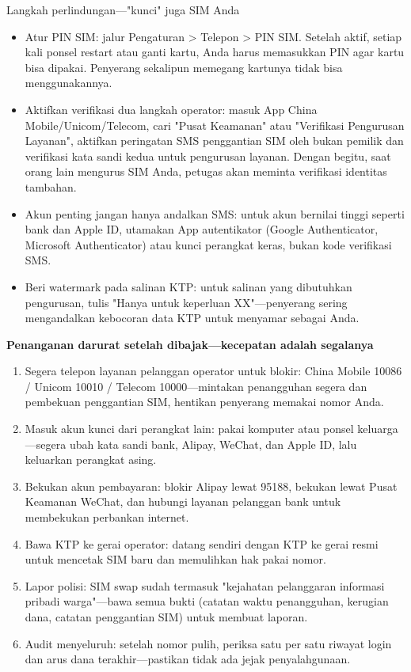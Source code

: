\begin{tcbwarn}{Langkah perlindungan—"kunci" juga SIM Anda}
\begin{itemize}
  \item Atur PIN SIM: jalur Pengaturan > Telepon > PIN SIM. Setelah aktif, setiap kali ponsel restart atau ganti kartu, Anda harus memasukkan PIN agar kartu bisa dipakai. Penyerang sekalipun memegang kartunya tidak bisa menggunakannya.
  \item Aktifkan verifikasi dua langkah operator: masuk App China Mobile/Unicom/Telecom, cari "Pusat Keamanan" atau "Verifikasi Pengurusan Layanan", aktifkan peringatan SMS penggantian SIM oleh bukan pemilik dan verifikasi kata sandi kedua untuk pengurusan layanan. Dengan begitu, saat orang lain mengurus SIM Anda, petugas akan meminta verifikasi identitas tambahan.
  \item Akun penting jangan hanya andalkan SMS: untuk akun bernilai tinggi seperti bank dan Apple ID, utamakan App autentikator (Google Authenticator, Microsoft Authenticator) atau kunci perangkat keras, bukan kode verifikasi SMS.
  \item Beri watermark pada salinan KTP: untuk salinan yang dibutuhkan pengurusan, tulis "Hanya untuk keperluan XX"—penyerang sering mengandalkan kebocoran data KTP untuk menyamar sebagai Anda.
\end{itemize}

\end{tcbwarn}

\textbf{Penanganan darurat setelah dibajak—kecepatan adalah segalanya}\par

\begin{enumerate}
  \item Segera telepon layanan pelanggan operator untuk blokir: China Mobile 10086 / Unicom 10010 / Telecom 10000—mintakan penangguhan segera dan pembekuan penggantian SIM, hentikan penyerang memakai nomor Anda.
  \item Masuk akun kunci dari perangkat lain: pakai komputer atau ponsel keluarga—segera ubah kata sandi bank, Alipay, WeChat, dan Apple ID, lalu keluarkan perangkat asing.
  \item Bekukan akun pembayaran: blokir Alipay lewat 95188, bekukan lewat Pusat Keamanan WeChat, dan hubungi layanan pelanggan bank untuk membekukan perbankan internet.
  \item Bawa KTP ke gerai operator: datang sendiri dengan KTP ke gerai resmi untuk mencetak SIM baru dan memulihkan hak pakai nomor.
  \item Lapor polisi: SIM swap sudah termasuk "kejahatan pelanggaran informasi pribadi warga"—bawa semua bukti (catatan waktu penangguhan, kerugian dana, catatan penggantian SIM) untuk membuat laporan.
  \item Audit menyeluruh: setelah nomor pulih, periksa satu per satu riwayat login dan arus dana terakhir—pastikan tidak ada jejak penyalahgunaan.
\end{enumerate}

